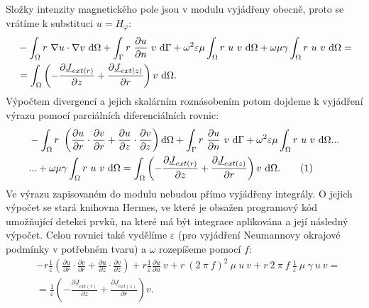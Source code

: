 \documentclass[12pt,a4paper,oneside]{article}
\numberwithin{equation}{section} %
\numberwithin{figure}{section} %
\numberwithin{table}{section} %
\newcommand{\faz}[1]{{\underline{#1}}} %
\newcommand\numberthis{\addtocounter{equation}{1}\tag{\theequation}}
\begin{document}
Složky intenzity magnetického pole jsou v modulu vyjádřeny obecně, proto se vrátíme k substituci $u = H _{\varphi}$:
\begin{equation}
\begin{split}
&- \int _{\Omega} r ~ \nabla u \cdot \nabla v ~ \ud \Omega + \int _{\Gamma} r ~ \frac{\partial u}{\partial n} ~ v ~ \ud \Gamma + \omega ^2 \varepsilon \mu \int _{\Omega} r ~ u ~ v ~ \ud \Omega + \omega \mu \gamma \int _{\Omega} r ~ u ~ v ~ \ud \Omega = 
\\
&= \int _{\Omega} \left( - \frac{\partial \faz{J} _{ext(r)}}{\partial z} + \frac{\partial \faz{J} _{ext(z)}}{\partial r} \right) v ~ \ud \Omega .
\end{split}
\end{equation}
Výpočtem divergencí a jejich skalárním roznásobením potom dojdeme k vyjádření výrazu pomocí parciálních diferenciálních rovnic:
\begin{align*}
&- \int _{\Omega} r ~ \left( \frac{\partial u}{\partial r} \cdot \frac{\partial v}{\partial r} + \frac{\partial u}{\partial z} \cdot \frac{\partial v}{\partial z} \right) \ud \Omega + \int _{\Gamma} r ~ \frac{\partial u}{\partial n} ~ v ~ \ud \Gamma + \omega ^2 \varepsilon \mu \int _{\Omega} r ~ u ~ v ~ \ud \Omega...\\
&... + \omega \mu \gamma \int _{\Omega} r ~ u ~ v ~ \ud \Omega = \int _{\Omega}\left( - \frac{\partial \faz{J} _{ext(r)}}{\partial z} + \frac{\partial \faz{J} _{ext(z)}}{\partial r} \right) v ~ \ud \Omega .
\numberthis
\end{align*}
Ve výrazu zapisovaném do modulu nebudou přímo vyjádřeny integrály. O jejich výpočet se stará knihovna Hermes, ve které je obsažen programový kód umožňující detekci prvků, na které má být integrace aplikována a její následný výpočet. Celou rovnici také vydělíme $\varepsilon$ (pro vyjádření Neumannovy okrajové podmínky v potřebném tvaru) a $\omega$ rozepíšeme pomocí $f$:
\begin{equation}
\label{HphiWeakEpsilon}
\begin{split}
&- r \frac{1}{\varepsilon} \left( \frac{\partial u}{\partial r} \cdot \frac{\partial v}{\partial r} + \frac{\partial u}{\partial z} \cdot \frac{\partial v}{\partial z} \right) + r \frac{1}{\varepsilon} \frac{\partial u}{\partial n} ~ v + r ~ (2 ~ \pi ~ f) ^2 ~ \mu ~ u ~ v + r ~ 2 ~ \pi ~ f ~ \frac{1}{\varepsilon} ~ \mu ~ \gamma ~ u ~ v =\\ 
&= \frac{1}{\varepsilon} \left( - \frac{\partial \faz{J} _{ext(r)}}{\partial z} + \frac{\partial \faz{J} _{ext(z)}}{\partial r} \right) v .
\end{split}
\end{equation}
\end{document}
